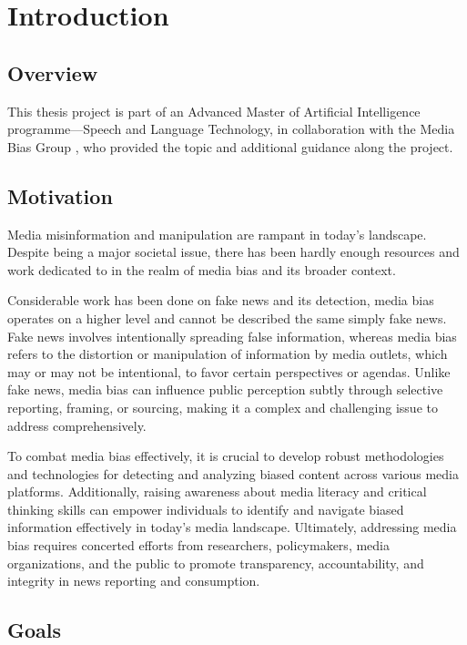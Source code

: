 \chapter{Introduction}
\label{cha:1}

\section{Overview}

This thesis project is part of an Advanced Master of Artificial Intelligence programme—Speech and Language Technology, in collaboration with the Media Bias Group \cite{media-bias-group}, who provided the topic and additional guidance along the project.

\section{Motivation}



Media misinformation and manipulation are rampant in today's landscape. Despite being a major societal issue, there has been hardly enough resources and work dedicated to in the realm of media bias and its broader context.

Considerable work has been done on fake news and its detection, media bias operates on a higher level and cannot be described the same simply fake news. Fake news involves intentionally spreading false information, whereas media bias refers to the distortion or manipulation of information by media outlets, which may or may not be intentional, to favor certain perspectives or agendas. Unlike fake news, media bias can influence public perception subtly through selective reporting, framing, or sourcing, making it a complex and challenging issue to address comprehensively.

To combat media bias effectively, it is crucial to develop robust methodologies and technologies for detecting and analyzing biased content across various media platforms. Additionally, raising awareness about media literacy and critical thinking skills can empower individuals to identify and navigate biased information effectively in today's media landscape. Ultimately, addressing media bias requires concerted efforts from researchers, policymakers, media organizations, and the public to promote transparency, accountability, and integrity in news reporting and consumption.

\section{Goals}

